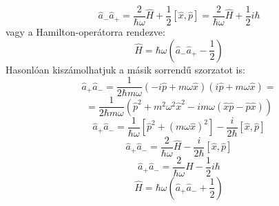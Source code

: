 \documentclass[a4paper,12pt]{article}
\begin{document}
\begin{equation}
    \hat{a}_- \hat{a}_+ = \frac{2}{\hbar \omega} \hat{H} + \frac{1}{2} [\hat{x}, \hat{p}] = \frac{2}{\hbar \omega} \hat{H} + \frac{1}{2} i \hbar
\end{equation}
vagy a Hamilton-operátorra rendezve:
\begin{equation}
    \hat{H} = \hbar \omega \left( \hat{a}_- \hat{a}_+ - \frac{1}{2} \right)
\end{equation}
Hasonlóan kiszámolhatjuk a másik sorrendű szorzatot is:
\begin{equation}
    \hat{a}_+ \hat{a}_- = \frac{1}{2 \hbar m \omega} \left( - i \hat{p} + m \omega \hat{x} \right) \left( i \hat{p} + m \omega \hat{x} \right) = 
\end{equation}
\begin{equation}
    = \frac{1}{2 \hbar m \omega} \left( \hat{p}^2 + m^2 \omega^2 \hat{x}^2 - i m \omega (\hat{x} \hat{p} - \hat{p} \hat{x}) \right)
\end{equation}
\begin{equation}
    \hat{a}_+ \hat{a}_- = \frac{1}{\hbar \omega} \left[\hat{p}^2 + (m \omega \hat{x})^2\right] - \frac{i}{2 \hbar} [\hat{x}, \hat{p}]
\end{equation}
\begin{equation}
    \hat{a}_+ \hat{a}_- = \frac{2}{\hbar \omega} \hat{H} - \frac{i}{2 \hbar} [\hat{x}, \hat{p}]
\end{equation}
\begin{equation}
    \hat{a}_+ \hat{a}_- = \frac{2}{\hbar \omega} \hat{H} - \frac{1}{2} i \hbar
\end{equation}
\begin{equation}
    \hat{H} = \hbar \omega \left( \hat{a}_+ \hat{a}_- + \frac{1}{2} \right)
\end{equation}
\end{document}
